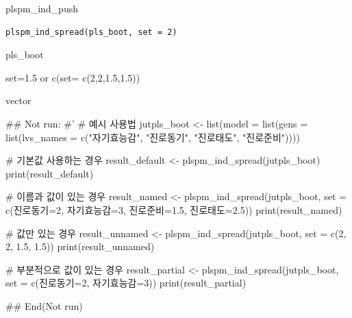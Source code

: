\documentclass[a4paper]{book}
\begin{document}
%
\begin{Description}
plspm\_ind\_push
\end{Description}
%
\begin{Usage}
\begin{verbatim}
plspm_ind_spread(pls_boot, set = 2)
\end{verbatim}
\end{Usage}
%
\begin{Arguments}
\begin{ldescription}
\item[\code{pls\_boot}] pls\_boot

\item[\code{set}] set=1.5 or c(set= c(2,2,1.5,1.5))
\end{ldescription}
\end{Arguments}
%
\begin{Value}
vector
\end{Value}
%
\begin{Examples}
\begin{ExampleCode}

\#\# Not run: 
#'
# 예시 사용법
jutpls_boot <- list(model = list(gens = list(lvs_names = c("자기효능감", "진로동기", "진로태도", "진로준비"))))

# 기본값 사용하는 경우
result_default <- plspm_ind_spread(jutpls_boot)
print(result_default)

# 이름과 값이 있는 경우
result_named <- plspm_ind_spread(jutpls_boot, set = c(진로동기=2, 자기효능감=3, 진로준비=1.5, 진로태도=2.5))
print(result_named)

# 값만 있는 경우
result_unnamed <- plspm_ind_spread(jutpls_boot, set = c(2, 2, 1.5, 1.5))
print(result_unnamed)

# 부분적으로 값이 있는 경우
result_partial <- plspm_ind_spread(jutpls_boot, set = c(진로동기=2, 자기효능감=3))
print(result_partial)


## End(Not run)



\end{ExampleCode}
\end{Examples}
\end{document}
